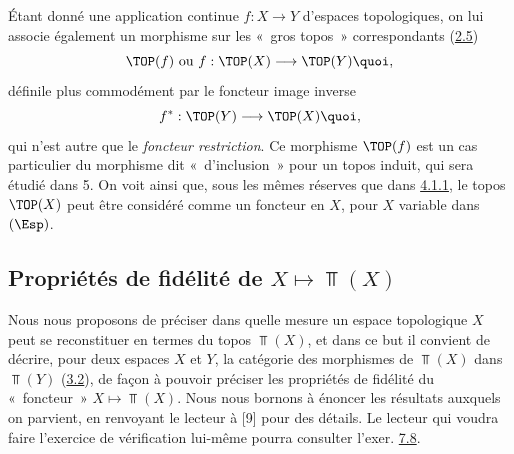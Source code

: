 \documentclass[10pt]{../fichiers-configuration-latex/smfart}
\begin{document}
\subsubsection{}
Étant donné une application continue $f:X\rightarrow Y$ d'espaces
topologiques, on lui associe également un morphisme sur les « gros
topos »  correspondants (\hyperref[IV.subsec2.5]{2.5})
$$
\TOP(f)\mbox{ ou } f:\TOP(X)\longrightarrow \TOP(Y){\quoi},
$$
défini\pageoriginale le plus commodément par le foncteur image
inverse
$$
f^{\ast}:\TOP(Y)\longrightarrow \TOP(X){\quoi},
$$
qui n'est autre que le \emph{foncteur restriction}. Ce morphisme
$\TOP(f)$ est un cas particulier du morphisme dit
« d'inclusion » pour un topos induit, qui sera étudié dans 5. On voit ainsi
que, sous les mêmes réserves que dans \hyperref[IV.subsubsec4.1.1]{4.1.1},
le topos $\TOP(X)$ peut être considéré comme un foncteur en
$X$, pour $X$ variable dans $(\Esp)$.

\subsection{Propriétés de fidélité de $X\mapsto \Top(X)$}

Nous nous proposons de préciser dans quelle mesure un espace
topologique $X$ peut se reconstituer en termes du topos $\Top(X)$,
et dans ce but il convient de décrire, pour deux espaces $X$ et $Y$,
la catégorie des morphismes de $\Top(X)$ dans $\Top(Y)$
(\hyperref[IV.subsec3.2]{3.2}), de façon à pouvoir préciser les propriétés
de fidélité du « foncteur »  $X\mapsto \Top(X)$. Nous nous
bornons à énoncer les résultats auxquels on parvient, en renvoyant
le lecteur à [9] pour des détails. Le lecteur qui voudra faire
l'exercice de vérification lui-même pourra consulter l'exer.
\hyperref[IV.exer7.8]{7.8}.
\end{document}
